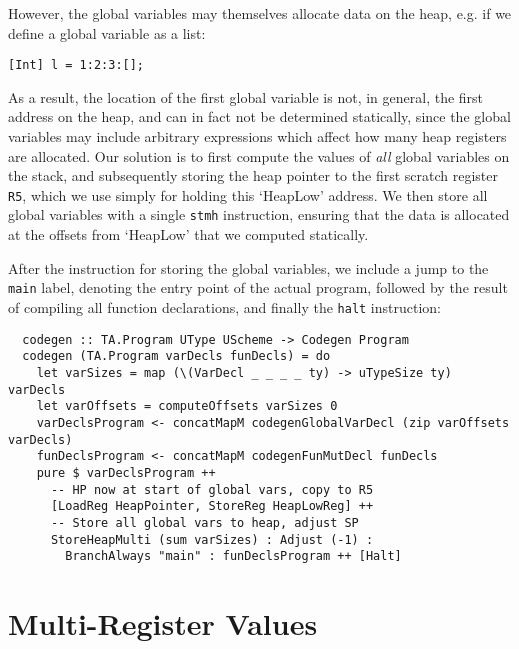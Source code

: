 However, the global variables may themselves allocate data on the heap, e.g. if
we define a global variable as a list:
\begin{lstlisting}[language=spl]
  [Int] l = 1:2:3:[];
\end{lstlisting}
%
As a result, the location of the first global variable is not, in general, the
first address on the heap, and can in fact not be determined statically, since
the global variables may include arbitrary expressions which affect how many
heap registers are allocated.
Our solution is to first compute the values of \emph{all} global variables on
the stack, and subsequently storing the heap pointer to the first scratch
register \texttt{R5}, which we use simply for holding this `HeapLow' address.
We then store all global variables with a single \texttt{stmh} instruction,
ensuring that the data is allocated at the offsets from `HeapLow' that we
computed statically.

After the instruction for storing the global variables, we include a jump to the
\texttt{main} label, denoting the entry point of the actual program, followed by
the result of compiling all function declarations, and finally the \texttt{halt}
instruction:
%
\begin{verbatim}
  codegen :: TA.Program UType UScheme -> Codegen Program
  codegen (TA.Program varDecls funDecls) = do
    let varSizes = map (\(VarDecl _ _ _ _ ty) -> uTypeSize ty) varDecls
    let varOffsets = computeOffsets varSizes 0
    varDeclsProgram <- concatMapM codegenGlobalVarDecl (zip varOffsets varDecls)
    funDeclsProgram <- concatMapM codegenFunMutDecl funDecls
    pure $ varDeclsProgram ++
      -- HP now at start of global vars, copy to R5
      [LoadReg HeapPointer, StoreReg HeapLowReg] ++
      -- Store all global vars to heap, adjust SP
      StoreHeapMulti (sum varSizes) : Adjust (-1) :
        BranchAlways "main" : funDeclsProgram ++ [Halt]
\end{verbatim}



\section{Multi-Register Values} \label{sec:multi-reg-vals}

